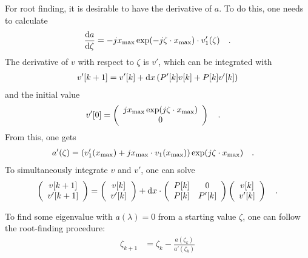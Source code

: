 \documentclass{article}
\begin{document}
For root finding, it is desirable to have the derivative of $a$. To do this, one needs to calculate 
\begin{align}
\frac{{\rm d}a}{{\rm d}\zeta} = -j x_{\rm max} \exp(-j\zeta \cdot x_{\rm max}) \cdot v_1'(\zeta) \quad .
\end{align}
The derivative of $v$ with respect to $\zeta$ is $v'$, which can be integrated with
\begin{align}
v'[k+1] = v'[k] + {\rm d}x \left( P'[k] v[k]  + P[k] v'[k] \right)
\end{align}
and the initial value
\begin{align}
v'[0] &=  \left( \begin{array}{c}jx_{\rm max}  \exp(j  \zeta \cdot  x_{\rm max}) \\ 0 \end{array} \right) \quad .
\end{align}
From this, one gets
\begin{align}
a'(\zeta) & = (v'_1(x_{\rm max}) + jx_{\rm max}\cdot v_1(x_{\rm max}))\exp(j\zeta \cdot x_{\rm max}) \quad .
\end{align}
To simultaneously integrate $v$ and $v'$, one can solve 
\begin{align}
\left( \begin{array}{c}v[k+1]\\v'[k+1] \end{array} \right) = \left( \begin{array}{c}v[k]\\v'[k] \end{array} \right) + {\rm d}x \cdot \left( \begin{array}{cc}P[k]& 0 \\ P[k] & P'[k] \end{array} \right)  \left( \begin{array}{c}v[k]\\v'[k] \end{array} \right) \quad .
\end{align}

To find some eigenvalue with $a(\lambda)=0$ from a starting value $\zeta$, one can follow the root-finding procedure: 
\begin{align} \zeta_{k+1} &= \zeta_k -  \frac{ a(\zeta_k)}{a'(\zeta_k)}\end{align}
\end{document}
